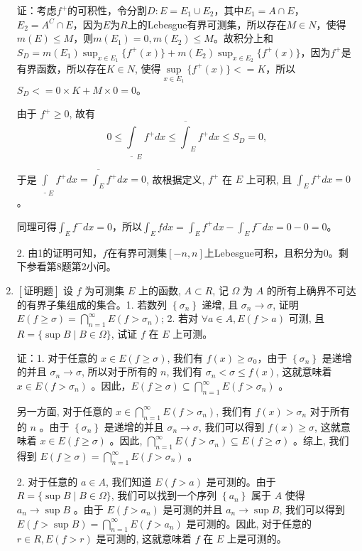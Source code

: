 \documentclass{article}
\begin{document}
\begin{enumerate}
证：考虑$f^{+}$的可积性，令分割$D:E=E_1 \cup E_2$，其中$E_1 = A\cap E$，$E_2 = A^{C}\cap E$，因为$E$为$R$上的Lebesgue有界可测集，所以存在$M\in N$，使得$m(E) \leq M$，则$m(E_1)=0, m(E_2) \leq M$。故积分上和$S_D=m(E_1)\sup_{x\in E_1} \{f^{+}(x)\} + m(E_2)\sup_{x\in E_2} \{f^{+}(x)\}$，因为$f^{+}$是有界函数，所以存在$K \in N$, 使得$\mathop{sup}\limits_{x\in E_1} \{f^{+}(x)\} <= K$，所以$S_D <= 0\times K + M\times 0 = 0$。

由于 $f^{+} \geq 0$, 故有
$$
0 \leq \underline{\int}_{E} f^{+} d x \leq \overline{\int}_{E} f^{+} d x \leq S_D=0,
$$

于是 $\underline{\int}_{E} f^{+} d x=\overline{\int_{E}} f^{+} d x=0$, 故根据定义, $f^{+}$ 在 $E$ 上可积, 且 $\int_{E} f^{+} d x=0$ 。

同理可得$\int_{E} f^{-} d x=0$，所以$\int_{E} f d x=\int_{E} f^{+} d x-\int_{E} f^{-} d x=0-0=0$。

2. 由1的证明可知，$f$在有界可测集$[-n, n]$上Lebesgue可积，且积分为0。剩下参看第8题第2小问。

\item $\left[\textbf{证明题}\right]$ 设 $f$ 为可测集 $E$ 上的函数, $A \subset R$, 记 $\Omega$ 为 $A$ 的所有上确界不可达的有界子集组成的集合。1. 若数列 $\left\{\sigma_n\right\}$ 递增, 且 $\sigma_n \rightarrow \sigma$, 证明 $E(f \geq \sigma)=\bigcap_{n=1}^{\infty} E\left(f>\sigma_n\right)$;
2. 若对 $\forall a \in A, E(f>a)$ 可测, 且 $R=\{\sup B \mid B \in \Omega\}$, 试证 $f$ 在 $E$ 上可测。

证：1. 对于任意的 $x \in E(f \geq \sigma)$, 我们有 $f(x) \geq \sigma_0$，由于 $\left\{\sigma_n\right\}$ 是递增的并且 $\sigma_n \rightarrow \sigma$, 所以对于所有的 $n$, 我们有 $\sigma_n < \sigma \leq f(x)$, 这就意味着 $x \in E\left(f>\sigma_n\right)$ 。因此，$E(f \geq \sigma) \subseteq \bigcap_{n=1}^{\infty} E\left(f>\sigma_n\right)$ 。

另一方面, 对于任意的 $x \in \bigcap_{n=1}^{\infty} E\left(f>\sigma_n\right)$, 我们有 $f(x)>\sigma_n$ 对于所有的 $n$ 。由于 $\left\{\sigma_n\right\}$ 是递增的并且 $\sigma_n \rightarrow \sigma$, 我们可以得到 $f(x) \geq \sigma$, 这就意味着 $x \in E(f \geq \sigma)$ 。因此, $\bigcap_{n=1}^{\infty} E\left(f>\sigma_n\right) \subseteq E(f \geq \sigma)$ 。综上, 我们得到 $E(f \geq \sigma)=\bigcap_{n=1}^{\infty} E\left(f>\sigma_n\right)$ 。

2. 对于任意的 $a \in A$, 我们知道 $E(f>a)$ 是可测的。由于 $R=\{\sup B \mid B \in \Omega\}$, 我们可以找到一个序列 $\left\{a_n\right\}$ 属于 $A$ 使得 $a_n \rightarrow \sup B$ 。由于 $E\left(f>a_n\right)$ 是可测的并且 $a_n \rightarrow \sup B$, 我们可以得到 $E(f>\sup B)=\bigcap_{n=1}^{\infty} E\left(f>a_n\right)$ 是可测的。因此, 对于任意的 $r \in R, E(f>r)$ 是可测的, 这就意味着 $f$ 在 $E$ 上是可测的。

\end{enumerate}
\end{document}

